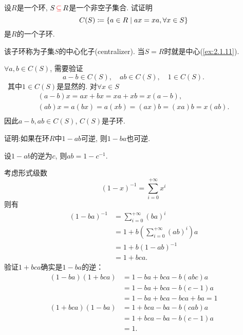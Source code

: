 \begin{problem}
    设$R$是一个环, $S \,\textcolor{red}{\subseteq}\, R$是一个非空子集合. 试证明
\[
    C(S) \mathrel{\coloneqq} \{a \in R \mid ax = xa, \forall x \in S \}
\]
是$R$的一个子环.
\end{problem}

\begin{solution}
    该子环称为子集$S$的中心化子(centralizer). 当$S = R$时就是中心(\ref{ex:2.1.11}).

    $\forall a, b \in C(S)$, 需要验证
    \[
        a - b \in C(S), \quad ab \in C(S), \quad 1 \in C(S).
    \]\
    其中$1 \in C(S)$是显然的.
    对$\forall x \in S$
    \[
    \begin{gathered}
        (a - b)x = ax + bx = xa + xb = x(a - b),\\
        (ab)x = a(bx) = a(xb) = (ax)b = (xa)b = x(ab).\\
    \end{gathered}
    \]
    因此$a - b, ab \in C(S)$, $C(S)$是子环.
\end{solution}

\begin{problem}\label{ex:1.2.5}
    证明:如果在环$R$中$1 - ab$可逆, 则$1 - ba$也可逆.
\end{problem}

\begin{solution}
    设$1 - ab$的逆为$c$, 则$ab = 1 - c^{-1}$.

    考虑形式级数
    \[
        (1 - x)^{-1} = \sum_{i = 0}^{+\infty} x^i
    \]
    则有
    \[
    \begin{aligned}
        (1 - ba)^{-1} &= \sum_{i = 0}^{+\infty} (ba)^i\\
        &= 1 + b\left(\sum_{i = 0}^{+\infty} (ab)^i\right)a\\
        &= 1 + b(1 - ab)^{-1}\\
        &= 1 + bca.
    \end{aligned} 
    \]
    验证$1 + bca$确实是$1 - ba$的逆：
    \[
    \begin{aligned}
        (1 - ba)(1 + bca) &= 1 - ba + bca - b(abc)a\\
        &= 1 - ba + bca -b(c - 1)a\\
        &= 1 - ba + bca -bca + ba = 1\\
        (1 + bca)(1 - ba) &= 1 + bca - ba - b(cab)a\\
        &= 1 + bca - ba - b(c - 1)a\\
        &= 1.
    \end{aligned}
    \]
\end{solution}

